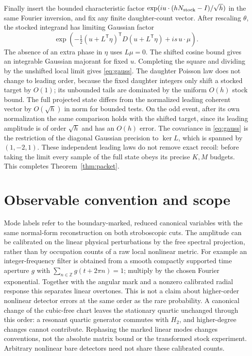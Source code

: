 \documentclass[11pt]{article}
\numberwithin{equation}{section}
\begin{document}
Finally insert the bounded characteristic factor
\(\exp(i u\cdot(hN_{\rm stock}-I)/\sqrt h)\) in the same
Fourier inversion, and fix any finite daughter-count vector.
After rescaling \(\theta\), the stocked integrand has limiting
Gaussian factor
\[
 \exp\!\left(-\tfrac12(u+L^{\mathsf T}\eta)^{\mathsf T}
                  D(u+L^{\mathsf T}\eta)+is\,u\cdot\mu\right).
\]
The absence of an extra phase in \(\eta\) uses \(L\mu=0\).
The shifted cosine bound gives an integrable Gaussian
majorant for fixed \(u\). Completing the square and dividing
by the unshifted local limit gives \eqref{eq:gauss}.
The daughter Poisson law does not change to leading order,
because the fixed daughter integers only shift a stocked
target by \(O(1)\); its unbounded tails are dominated by the
uniform \(O(h)\) stock bound. The full projected state
differs from the normalized leading coherent vector by
\(O(\sqrt h)\) in norm for bounded tests. On the odd event,
after its own normalization the same comparison holds with
the shifted target, since its leading amplitude is
of order \(\sqrt h\) and has an \(O(h)\) error. The
covariance in \eqref{eq:gauss} is the restriction of the
diagonal Gaussian precision to \(\ker L\), which is
spanned by \((1,-2,1)\). These independent leading laws
do not remove exact recoil: before taking the limit every
sample of the full state obeys its precise \(K,M\) budgets.
This completes Theorem~\ref{thm:packet}.

\section{Observable convention and scope}

Mode labels refer to the boundary-marked, reduced canonical
variables with the same normal-form reconstruction on both
stroboscopic cuts. The amplitude can be calibrated on the
linear physical perturbations by the free spectral projection,
rather than by occupation counts of a raw local nonlinear metric.
For example an integer-frequency filter is obtained from a smooth
compactly supported time aperture \(g\) with
\(\sum_{n\in\mathbb Z}g(t+2\pi n)=1\); multiply by the
chosen Fourier exponential. Together with the angular mark
and a nonzero calibrated radial response this separates linear
overtones. This is not a claim about higher-order
nonlinear detector errors at the same order as the rare
probability. A canonical change of the cubic-free chart leaves
the stationary quartic unchanged through this order:
a resonant quartic generator commutes with \(H_2\), and
higher-degree changes cannot contribute. Rephasing the
marked linear modes changes conventions, not the absolute
matrix bound or the transformed stock experiment. Arbitrary
nonlinear bare detectors need not share these calibrated counts.
\end{document}
